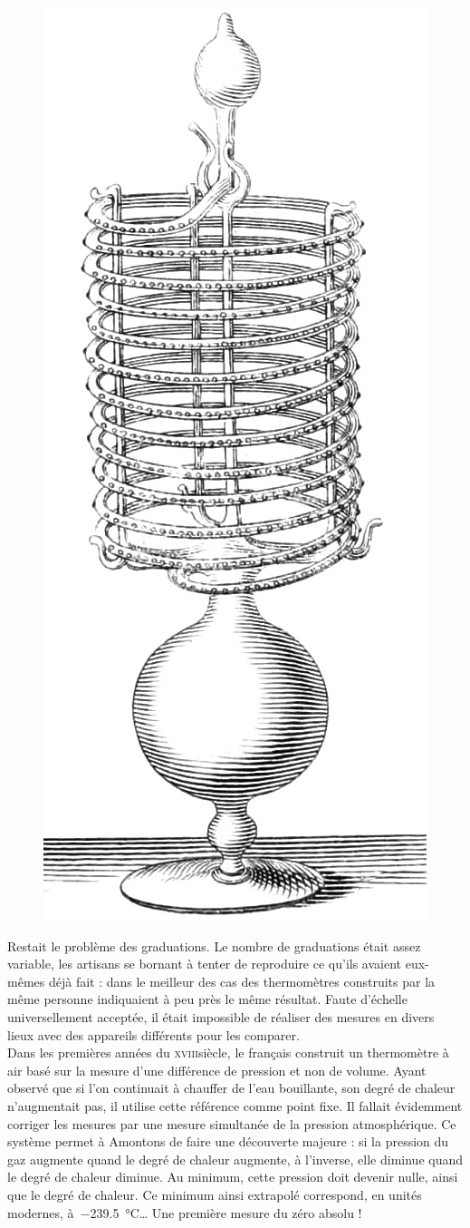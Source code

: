 	\begin{figure}
		\begin{center}
			\includegraphics[height=0.7\textwidth]{images/thermometre_florence_1667.jpg}
		\end{center}
		\label{fig_thermometre_florence}
	\end{figure}
	
	Restait le problème des graduations. Le nombre de graduations était assez variable, les artisans se bornant à tenter de reproduire ce qu'ils avaient eux-mêmes déjà fait : dans le meilleur des cas des thermomètres construits par la même personne indiquaient à peu près le même résultat. Faute d'échelle universellement acceptée, il était impossible de réaliser des mesures en divers lieux avec des appareils différents pour les comparer.\\
	Dans les premières années du \textsc{xviii}\ieme siècle, le français  construit un thermomètre à air basé sur la mesure d'une différence de pression et non de volume. Ayant observé que si l'on continuait à chauffer de l'eau bouillante, son degré de chaleur n'augmentait pas, il utilise cette référence comme point fixe. Il fallait évidemment corriger les mesures par une mesure simultanée de la pression atmosphérique. Ce système permet à Amontons de faire une découverte majeure : si la pression du gaz augmente quand le degré de chaleur augmente, à l'inverse, elle diminue quand le degré de chaleur diminue. Au minimum, cette pression doit devenir nulle, ainsi que le degré de chaleur. Ce minimum ainsi extrapolé correspond, en unités modernes, à~\SI{-239,5}{\degreeCelsius}… Une première mesure du zéro absolu !
	
